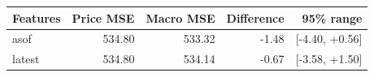 \begin{tabular}{@{}lrrrr@{}}\toprule
Features & Price MSE & Macro MSE & Difference & 95\% range\\\midrule
asof & 534.80 & 533.32 & -1.48 & [-4.40, +0.56]\\
latest & 534.80 & 534.14 & -0.67 & [-3.58, +1.50]\\
\bottomrule
\end{tabular}
